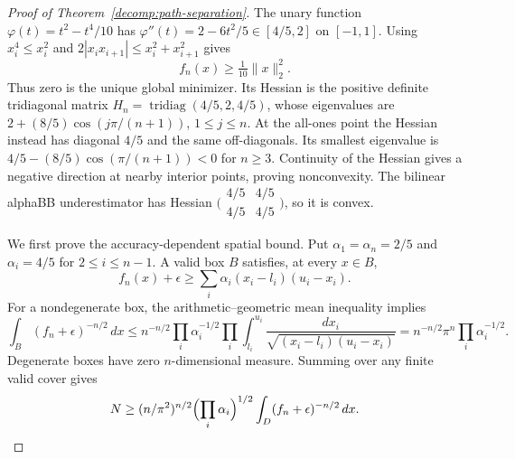 \begin{proof}[Proof of Theorem~\ref{decomp:path-separation}]
The unary function $\varphi(t)=t^2-t^4/10$ has
$\varphi''(t)=2-6t^2/5\in[4/5,2]$ on $[-1,1]$.
Using $x_i^4\le x_i^2$ and
$2|x_ix_{i+1}|\le x_i^2+x_{i+1}^2$ gives
\begin{equation}\label{decomp:path-growth}
 f_n(x)\ge\tfrac1{10}\|x\|_2^2.
\end{equation}
Thus zero is the unique global minimizer. Its Hessian is the positive
definite tridiagonal matrix
$H_n=\operatorname{tridiag}(4/5,2,4/5)$, whose eigenvalues are
$2+(8/5)\cos(j\pi/(n+1))$, $1\le j\le n$.
At the all-ones point the Hessian instead has diagonal $4/5$ and the same
off-diagonals. Its smallest eigenvalue is
$4/5-(8/5)\cos(\pi/(n+1))<0$ for $n\ge3$. Continuity of the Hessian
gives a negative direction at nearby interior points, proving
nonconvexity. The bilinear alphaBB underestimator has Hessian
$\bigl(\begin{smallmatrix}4/5&4/5\\4/5&4/5\end{smallmatrix}\bigr)$,
so it is convex.

We first prove the accuracy-dependent spatial bound. Put
$\alpha_1=\alpha_n=2/5$ and $\alpha_i=4/5$ for $2\le i\le n-1$.
A valid box $B$ satisfies, at every $x\in B$,
\begin{equation}\label{decomp:path-validity}
 f_n(x)+\epsilon\ge\sum_i\alpha_i(x_i-l_i)(u_i-x_i).
\end{equation}
For a nondegenerate box, the arithmetic--geometric mean inequality
implies
\[
 \int_B(f_n+\epsilon)^{-n/2}\,dx
 \le n^{-n/2}\prod_i\alpha_i^{-1/2}
       \prod_i\int_{l_i}^{u_i}\frac{dx_i}
                    {\sqrt{(x_i-l_i)(u_i-x_i)}}
 =n^{-n/2}\pi^n\prod_i\alpha_i^{-1/2}.
\]
Degenerate boxes have zero $n$-dimensional measure. Summing over any
finite valid cover gives
\begin{equation}\label{decomp:weighted-integral}
 N\ge(n/\pi^2)^{n/2}\Bigl(\prod_i\alpha_i\Bigr)^{1/2}
                         \int_D(f_n+\epsilon)^{-n/2}\,dx.
\end{equation}


\end{proof}
